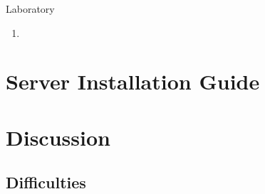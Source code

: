 \documentclass[letterpaper, 10 pt, conference]{ieeeconf}  %
\begin{document}
Laboratory\\

\begin{enumerate}
    \item 
\end{enumerate}


\section{Server Installation Guide}


\section{Discussion}
\subsection{Difficulties}
\maketitle{}

\addtolength{\textheight}{-12cm}   %











\end{document}
